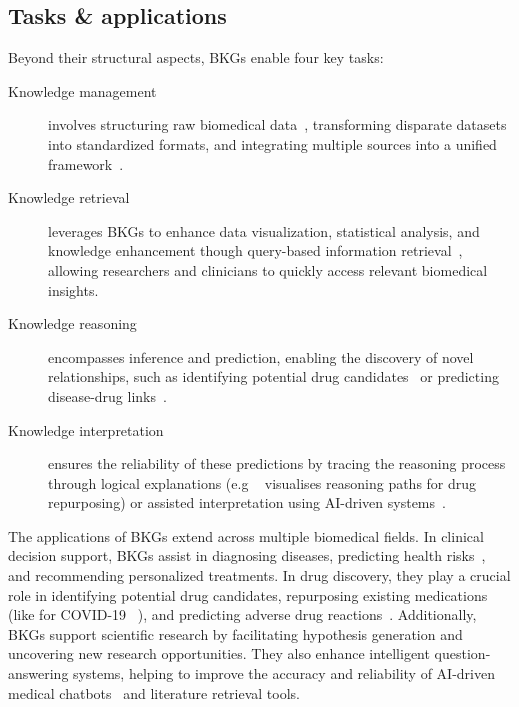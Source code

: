 \subsection{Tasks \& applications}
Beyond their structural aspects, BKGs enable four key tasks: 
\begin{description}
    \item[Knowledge management] involves structuring raw biomedical data~\cite{Percha2018globalNetworkBiomedicalRelationshipsDerivedText}\cite{Sang2018sematyp}, transforming disparate datasets into standardized formats, and integrating multiple sources into a unified framework~\cite{Himmelstein2017Hetionet}.
    \item[Knowledge retrieval] leverages BKGs to enhance data visualization, statistical analysis, and knowledge enhancement though query-based information retrieval~\cite{Pan2024unifyingLLMsKGs}\cite{Soman2024biomedicalKGOptimizedPromptGenerationForLLMs}, allowing researchers and clinicians to quickly access relevant biomedical insights.
    \item[Knowledge reasoning] encompasses inference and prediction, enabling the discovery of novel relationships, such as identifying potential drug candidates~\cite{Huang2024foundationModelDrugRepurposing} or predicting disease-drug links~\cite{li2022graphrepresentationlearningbiomedicine}.
    \item[Knowledge interpretation] ensures the reliability of these predictions by tracing the reasoning process through logical explanations (e.g ~\cite{Jimenez2024explainableDrugRepurposing} visualises reasoning paths for drug repurposing) or assisted interpretation using AI-driven systems~\cite{ONeil2024phenomicsAssistant}.
\end{description}

The applications of BKGs extend across multiple biomedical fields. In clinical decision support, BKGs assist in diagnosing diseases, predicting health risks~\cite{Tao2020miningHealthKnowledgeHealthRiskPrediction}, and recommending personalized treatments. In drug discovery, they play a crucial role in identifying potential drug candidates, repurposing existing medications (like for COVID-19 ~\cite{Zhang2021drugRepurposingForCovid19}), and predicting adverse drug reactions~\cite{Abdelaziz2017largeScaleMiningKGDrugDrugInteractions}. Additionally, BKGs support scientific research by facilitating hypothesis generation and uncovering new research opportunities. They also enhance intelligent question-answering systems, helping to improve the accuracy and reliability of AI-driven medical chatbots~\cite{Shu2024KG-LLM}\cite{Sung2021canLMBeKnowledgeBases} and literature retrieval tools.

